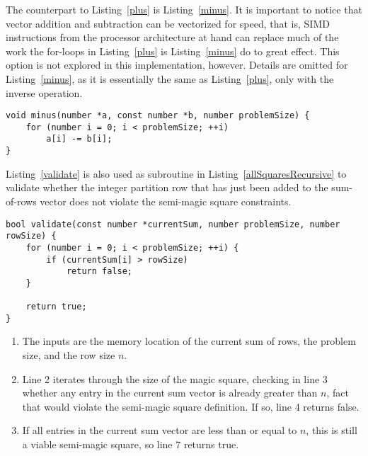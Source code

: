 The counterpart to Listing~\ref{plus} is Listing~\ref{minus}. It is important to notice that vector addition and subtraction can be vectorized for speed, that is, SIMD instructions from the processor architecture at hand can replace much of the work the for-loops in Listing~\ref{plus} is Listing~\ref{minus} do to great effect. This option is not explored in this implementation, however. Details are omitted for Listing~\ref{minus}, as it is essentially the same as Listing~\ref{plus}, only with the inverse operation.

\begin{lstlisting}[caption={Subtracting one vector from another.},label={minus}]
void minus(number *a, const number *b, number problemSize) {
    for (number i = 0; i < problemSize; ++i)
        a[i] -= b[i];
}
\end{lstlisting}

Listing~\ref{validate} is also used as subroutine in Listing~\ref{allSquaresRecursive} to validate whether the integer partition row that has just been added to the sum-of-rows vector does not violate the semi-magic square constraints.

\begin{lstlisting}[caption={Validating a sum of integer partition rows.},label={validate}]
bool validate(const number *currentSum, number problemSize, number rowSize) {
    for (number i = 0; i < problemSize; ++i) {
        if (currentSum[i] > rowSize)
            return false;
    }

    return true;
}
\end{lstlisting}

\begin{enumerate}
\item The inputs are the memory location of the current sum of rows, the problem size, and the row size $n$.
\item Line 2 iterates through the size of the magic square, checking in line 3 whether any entry in the current sum vector is already greater than $n$, fact that would violate the semi-magic square definition. If so, line 4 returns false.
\addtocounter{enumi}{4}
\item If all entries in the current sum vector are less than or equal to $n$, this is still a viable semi-magic square, so line 7 returns true.
\end{enumerate}

